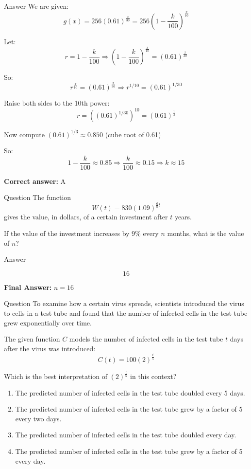 \documentclass{beamer}
\begin{document}
\begin{frame}{Answer}
\small
We are given:
\[
g(x) = 256(0.61)^{\frac{x}{30}} = 256\left(1 - \frac{k}{100}\right)^{\frac{x}{10}}
\]

Let:
\[
r = 1 - \frac{k}{100} \Rightarrow \left(1 - \frac{k}{100}\right)^{\frac{x}{10}} = (0.61)^{\frac{x}{30}}
\]

So:
\[
r^{\frac{x}{10}} = (0.61)^{\frac{x}{30}} \Rightarrow r^{1/10} = (0.61)^{1/30}
\]

Raise both sides to the 10th power:
\[
r = \left((0.61)^{1/30}\right)^{10} = (0.61)^{\frac{1}{3}}
\]

Now compute $(0.61)^{1/3} \approx 0.850$ (cube root of 0.61)

So:
\[
1 - \frac{k}{100} \approx 0.85 \Rightarrow \frac{k}{100} \approx 0.15 \Rightarrow k \approx 15
\]

\textbf{Correct answer:} A
\end{frame}

\begin{frame}{Question}
The function
\[
W(t) = 830(1.09)^{\frac{6}{8}t}
\]
gives the value, in dollars, of a certain investment after $t$ years. 

If the value of the investment increases by 9\% every $n$ months, what is the value of $n$?
\end{frame}


\begin{frame}{Answer}


\[
\boxed{16}
\]

\textbf{Final Answer:} $n = 16$
\end{frame}


\begin{frame}{Question}
To examine how a certain virus spreads, scientists introduced the virus to cells in a test tube and found that the number of infected cells in the test tube grew exponentially over time. 

The given function $C$ models the number of infected cells in the test tube $t$ days after the virus was introduced:
\[
C(t) = 100(2)^{\frac{t}{5}}
\]

Which is the best interpretation of $(2)^{\frac{t}{5}}$ in this context?

\begin{enumerate}
  \item[A)] The predicted number of infected cells in the test tube doubled every 5 days.
  \item[B)] The predicted number of infected cells in the test tube grew by a factor of 5 every two days.
  \item[C)] The predicted number of infected cells in the test tube doubled every day.
  \item[D)] The predicted number of infected cells in the test tube grew by a factor of 5 every day.
\end{enumerate}
\end{frame}
\end{document}
